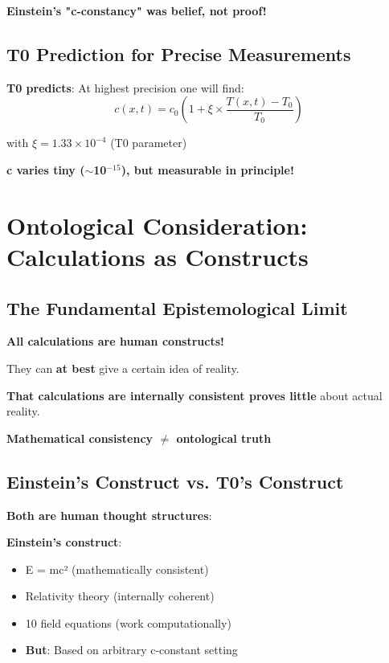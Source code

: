\documentclass[12pt,a4paper]{article}
\newcommand{\Tfield}{T}
\newcommand{\xipar}{\xi}
\begin{document}
	\textbf{Einstein's "c-constancy" was belief, not proof!}
	
	\subsection{T0 Prediction for Precise Measurements}
	
	\textbf{T0 predicts}: At highest precision one will find:
	\begin{equation}
		c(x,t) = c_0 \left(1 + \xipar \times \frac{\Tfield(x,t) - \Tfield_0}{\Tfield_0}\right)
	\end{equation}
	
	with $\xipar = 1.33 \times 10^{-4}$ (T0 parameter)
	
	\textbf{c varies tiny ($\sim$10$^{-15}$), but measurable in principle!}
	
	\section{Ontological Consideration: Calculations as Constructs}
	
	\subsection{The Fundamental Epistemological Limit}
	
	\begin{tcolorbox}[colback=purple!5!white,colframe=purple!75!black,title=Ontological Truth]
		\textbf{All calculations are human constructs!}
		
		They can \textbf{at best} give a certain idea of reality.
		
		\textbf{That calculations are internally consistent proves little} about actual reality.
		
		\textbf{Mathematical consistency $\neq$ ontological truth}
	\end{tcolorbox}
	
	\subsection{Einstein's Construct vs. T0's Construct}
	
	\textbf{Both are human thought structures}:
	
	\textbf{Einstein's construct}:
	\begin{itemize}
		\item E = mc² (mathematically consistent)
		\item Relativity theory (internally coherent)
		\item 10 field equations (work computationally)
		\item \textbf{But}: Based on arbitrary c-constant setting
	\end{itemize}
	
\end{document}
